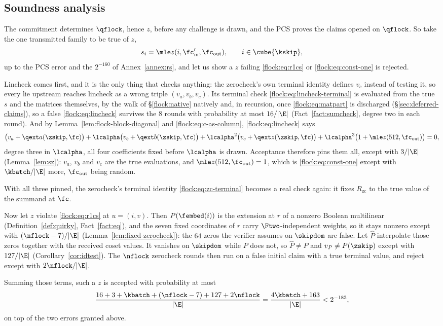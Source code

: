 \subsection{Soundness analysis}\label{flock:soundness}


The commitment determines $\qflock$, hence $z$, before any challenge is drawn, and the PCS proves the claims opened on $\qflock$. So take the one transmitted family to be true of $z$,
\[
s_i=\mle z(i,\fc'_{\mathrm{in}},\fc_{\mathrm{out}}),\qquad i\in\cube{\kskip},
\]
up to the PCS error and the $2^{-160}$ of Annex~\ref{annex:rs}, and let us show a $z$ failing \eqref{flock:eq:r1cs} or \eqref{flock:eq:const-one} is rejected.

Lincheck comes first, and it is the only thing that checks anything: the zerocheck's own terminal identity defines $v_c$ instead of testing it, so every lie upstream reaches lincheck as a wrong triple $(v_a,v_b,v_c)$. Its terminal check \eqref{flock:eq:lincheck-terminal} is evaluated from the true $s$ and the matrices themselves, by the walk of \S\ref{flock:native} natively and, in recursion, once \eqref{flock:eq:matpart} is discharged (\S\ref{sec:deferred-claims}), so a false \eqref{flock:eq:lincheck} survives the $8$ rounds with probability at most $16/|\E|$ (Fact~\ref{fact:sumcheck}, degree two in each round). And by Lemma~\ref{lem:flock-block-diagonal} and \eqref{flock:eq:c-as-column}, \eqref{flock:eq:lincheck} says
\[
\bigl(v_a+\qext a(\zskip,\fc)\bigr)+\lcalpha\bigl(v_b+\qext b(\zskip,\fc)\bigr)+\lcalpha^2\bigl(v_c+\qext z(\zskip,\fc)\bigr)+\lcalpha^3\bigl(1+\mle z(512,\fc_{\mathrm{out}})\bigr)=0,
\]
degree three in $\lcalpha$, all four coefficients fixed before $\lcalpha$ is drawn. Acceptance therefore pins them all, except with $3/|\E|$ (Lemma~\ref{lem:sz}): $v_a$, $v_b$ and $v_c$ are the true evaluations, and $\mle z(512,\fc_{\mathrm{out}})=1$, which is \eqref{flock:eq:const-one} except with $\kbatch/|\E|$ more, $\fc_{\mathrm{out}}$ being random.

With all three pinned, the zerocheck's terminal identity \eqref{flock:eq:zc-terminal} becomes a real check again: it fixes $R_{\mathrm{zc}}$ to the true value of the summand at $\fc$.

Now let $z$ violate \eqref{flock:eq:r1cs} at $u=(i,v)$. Then $P(\fembed(i))$ is the extension at $r$ of a nonzero Boolean multilinear (Definition~\ref{def:quirky}, Fact~\ref{fact:eq}), and the seven fixed coordinates of $r$ carry $\Ftwo$-independent weights, so it stays nonzero except with $(\nflock-7)/|\E|$ (Lemma~\ref{lem:fixed-zerocheck}): the $64$ zeros the verifier assumes on $\skipdom$ are false. Let $\hat P$ interpolate those zeros together with the received coset values. It vanishes on $\skipdom$ while $P$ does not, so $\hat P\neq P$ and $v_P\neq P(\zskip)$ except with $127/|\E|$ (Corollary~\ref{cor:idtest}). The $\nflock$ zerocheck rounds then run on a false initial claim with a true terminal value, and reject except with $2\nflock/|\E|$.

Summing those terms, such a $z$ is accepted with probability at most
\[
\frac{16+3+\kbatch+(\nflock-7)+127+2\nflock}{|\E|}=\frac{4\kbatch+163}{|\E|}<2^{-183},
\]
on top of the two errors granted above.
